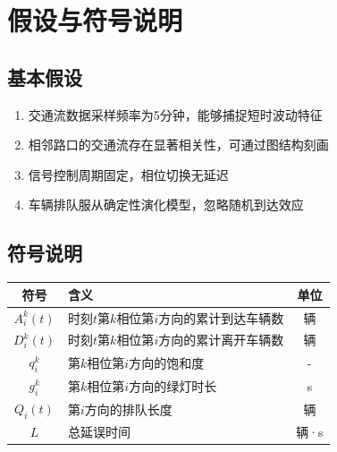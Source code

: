 \newpage
\section{假设与符号说明}

\subsection{基本假设}
\begin{enumerate}
    \item 交通流数据采样频率为5分钟，能够捕捉短时波动特征
    \item 相邻路口的交通流存在显著相关性，可通过图结构刻画
    \item 信号控制周期固定，相位切换无延迟
    \item 车辆排队服从确定性演化模型，忽略随机到达效应
\end{enumerate}

\subsection{符号说明}
\begin{center}
\begin{tabular}{c l c}
\hline
符号 & 含义 & 单位 \\
\hline
$A_i^k(t)$ & 时刻$t$第$k$相位第$i$方向的累计到达车辆数 & 辆 \\
$D_i^k(t)$ & 时刻$t$第$k$相位第$i$方向的累计离开车辆数 & 辆 \\
$q_i^k$ & 第$k$相位第$i$方向的饱和度 & - \\
$g_i^k$ & 第$k$相位第$i$方向的绿灯时长 & s \\
$Q_i(t)$ & 第$i$方向的排队长度 & 辆 \\
$L$ & 总延误时间 & 辆·s \\
\hline
\end{tabular}
\end{center}
